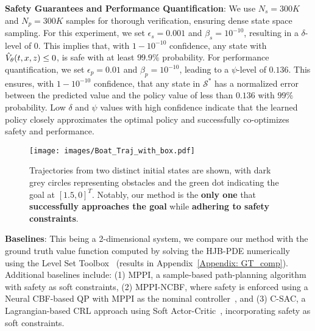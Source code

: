 \textbf{Safety Guarantees and Performance Quantification}:
We use $N_s = 300K$ and $N_p = 300K$ samples for thorough verification, ensuring dense state space sampling. 
For this experiment, we set $\epsilon_s = 0.001$ and $\beta_s = 10^{-10}$, resulting in a $\delta$-level of $0$. 
This implies that, with $1 - 10^{-10}$ confidence, any state with $\hat{V}_{\theta} (t,x,z) \leq 0$, is safe with at least $99.9\%$ probability. 
For performance quantification, we set $\epsilon_p = 0.01$ and $\beta_p = 10^{-10}$, leading to a $\psi$-level of $0.136$. This ensures, with $1 - 10^{-10}$ confidence, that any state in $\mathcal{S}^*$ has a normalized error between the predicted value and the policy value of less than $0.136$ with $99\%$ probability. Low $\delta$ and $\psi$ values with high confidence indicate that the learned policy closely approximates the optimal policy and successfully co-optimizes safety and performance.

\begin{figure}[t]
    \centering
    \texttt{[image: images/Boat\_Traj\_with\_box.pdf]}
    \vspace{-1em}
    \caption{Trajectories from two distinct initial states are shown, with dark grey circles representing obstacles and the green dot indicating the goal at $[1.5, 0]^T$. Notably, our method is the \textbf{only one} that \textbf{successfully approaches the goal} while \textbf{adhering to safety constraints}.}
    \vspace{-0.8em}
    \label{fig: Boat_Trajectories}
\end{figure}

\textbf{Baselines}: This being a 2-dimensional system, we compare our method with the ground truth value function computed by solving the HJB-PDE numerically using the Level Set Toolbox~\cite{mitchell2004toolbox} (results in Appendix~\ref{Appendix: GT_comp}). 
Additional baselines include: (1) MPPI, a sample-based path-planning algorithm with safety as soft constraints, (2) MPPI-NCBF, where safety is enforced using a Neural CBF-based QP with MPPI as the nominal controller~\cite{dawson2022safe,tayal2024learning}, and (3) C-SAC, a Lagrangian-based CRL approach using Soft Actor-Critic~\cite{pmlr-v80-haarnoja18b}, incorporating safety as soft constraints.


